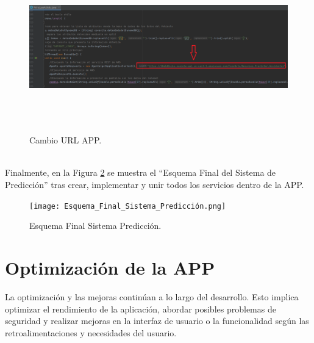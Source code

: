 \documentclass[a4paper,10pt, oneside, titlepage]{article}
\begin{document}
	\begin{figure}[!h]
		\centering
		\includegraphics[width = 1\linewidth, height = 7.4cm]{Cambio_URL_APP.png}
		\caption{Cambio URL APP.}
		\label{Cambio_URL_APP}
	\end{figure} \\
	\indent Finalmente, en la Figura \ref{Esquema_Final_Sistema_Predicción} se muestra el ``Esquema Final del Sistema de Predicción'' tras crear, implementar y unir todos los servicios dentro de la APP.
	\begin{figure}[!h]
		\centering
		\texttt{[image: Esquema\_Final\_Sistema\_Predicción.png]}
		\caption{Esquema Final Sistema Predicción.}
		\label{Esquema_Final_Sistema_Predicción}
	\end{figure}
	
	\section{Optimización de la APP}
	La optimización y las mejoras continúan a lo largo del desarrollo. Esto implica optimizar el rendimiento de la aplicación, abordar posibles problemas de seguridad y realizar mejoras en la interfaz de usuario o la funcionalidad según las retroalimentaciones y necesidades del usuario.
\end{document}
